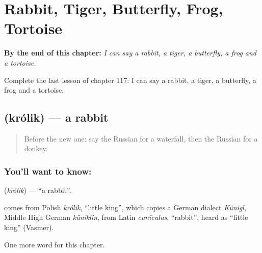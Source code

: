 
\chapter{Rabbit, Tiger, Butterfly, Frog, Tortoise}
\label{ch:ru-rabbit-tiger-butterfly-frog-tortoise}

\begin{chapteropening}
\textbf{By the end of this chapter:} \emph{I can say a rabbit, a tiger, a butterfly, a frog and a tortoise.}

Complete the last lesson of chapter 117: I can say a rabbit, a tiger, a butterfly, a frog and a tortoise.
\end{chapteropening}

\section[\texorpdfstring{\ru{кролик} (królik)}{кролик (królik)}]{ (królik) — a rabbit}

\label{lesson:RU-C117-rabbit}



\begin{quote}
Before the new one: say the Russian for a waterfall, then the Russian for a donkey.
\end{quote}

\subsection*{You'll want to know: }
\textbf{} (\emph{królik}) — \textquotedblleft{}a rabbit\textquotedblright{}.

\begin{cousinweb}
\textbf{} comes from Polish \emph{królik}, \textquotedblleft{}little king\textquotedblright{}, which copies a German dialect \emph{Künigl}, Middle High German \emph{küniklîn}, from Latin \emph{cunīculus}, \textquotedblleft{}rabbit\textquotedblright{}, heard as \textquotedblleft{}little king\textquotedblright{} (Vasmer).
\end{cousinweb}

\begin{grammarlens}[title={What you've built}]
One more word for this chapter.
\end{grammarlens}

